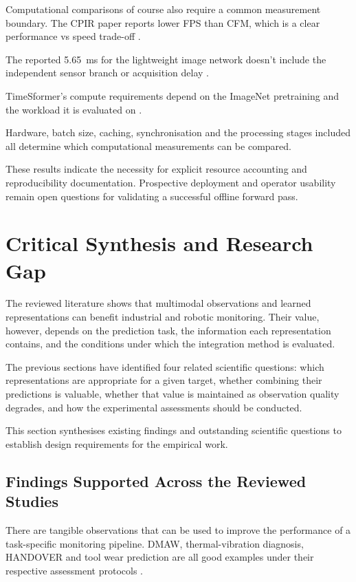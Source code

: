 Computational comparisons of course also require a common measurement boundary. The CPIR paper
reports lower FPS than CFM, which is a clear performance vs speed trade-off
\parencite{Shangguan2025CPIR}.

The reported 5.65~ms for the lightweight image network doesn't include the independent sensor branch
or acquisition delay \parencite[p.~6661, Table~V]{P035}.

TimeSformer's compute requirements depend on the ImageNet pretraining and the workload it is
evaluated on \parencite{P034}.

Hardware, batch size, caching, synchronisation and the processing stages included all determine
which computational measurements can be compared.

These results indicate the necessity for explicit resource accounting and reproducibility
documentation. Prospective deployment and operator usability remain open questions for validating a
successful offline forward pass.

\section{Critical Synthesis and Research Gap}

The reviewed literature shows that multimodal observations and learned representations can benefit
industrial and robotic monitoring. Their value, however, depends on the prediction task, the
information each representation contains, and the conditions under which the integration method is
evaluated.

The previous sections have identified four related scientific questions: which representations are
appropriate for a given target, whether combining their predictions is valuable, whether that value
is maintained as observation quality degrades, and how the experimental assessments should be
conducted.

This section synthesises existing findings and outstanding scientific questions to establish design
requirements for the empirical work.

\subsection{Findings Supported Across the Reviewed Studies}

There are tangible observations that can be used to improve the performance of a task-specific
monitoring pipeline. DMAW, thermal-vibration diagnosis, HANDOVER and tool wear prediction are all
good examples under their respective assessment protocols
\parencite{P003,Huo2022Multisensor,Thoduka2024Handover,P045}.

